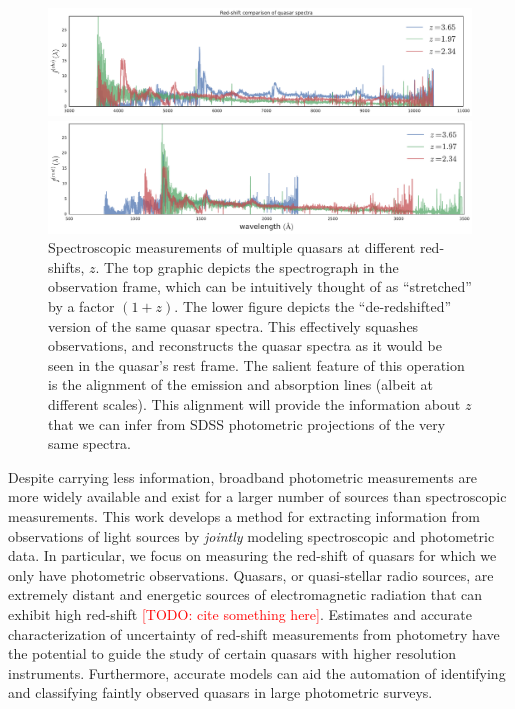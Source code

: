 \documentclass{article}
\newcommand{\red}[1]{\textcolor{red}{[TODO: #1]}}
\begin{document}
\begin{figure}[ht]
\vskip 0.2in
\begin{center}
\centerline{\includegraphics[width=2\columnwidth]{../figs/quasar_redshift_obs_frame}}
\centerline{\includegraphics[width=2\columnwidth]{../figs/quasar_redshift_rest_frame}}
\caption{Spectroscopic measurements of multiple quasars at different red-shifts, $z$.  The top graphic depicts the spectrograph in the observation frame, which can be intuitively thought of as ``stretched'' by a factor $(1+z)$.  The lower figure depicts the ``de-redshifted'' version of the same quasar spectra.  This effectively squashes observations, and reconstructs the quasar spectra as it would be seen in the quasar's rest frame.  The salient feature of this operation is the alignment of the emission and absorption lines (albeit at different scales).  This alignment will provide the information about $z$ that we can infer from SDSS photometric projections of the very same spectra.}
\label{fig:frames}
\end{center}
\vskip -0.2in
\end{figure} 

Despite carrying less information, broadband photometric measurements are more widely available and exist for a larger number of sources than spectroscopic measurements. 
This work develops a method for extracting information from observations of light sources by \emph{jointly} modeling spectroscopic and photometric data.  
In particular, we focus on measuring the red-shift of quasars for which we only have photometric observations.  
Quasars, or quasi-stellar radio sources, are extremely distant and energetic sources of electromagnetic radiation that can exhibit high red-shift \red{cite something here}.  
Estimates and accurate characterization of uncertainty of red-shift measurements from photometry have the potential to guide the study of certain quasars with higher resolution instruments.  
Furthermore, accurate models can aid the automation of identifying and classifying faintly observed quasars in large photometric surveys.  
\end{document}
